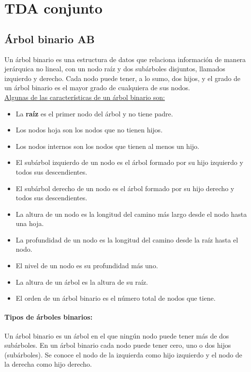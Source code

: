 \documentclass[../main.tex]{subfiles}
\begin{document}
\section{TDA conjunto} 
    \subsection{Árbol binario AB}
        Un árbol binario es una estructura de datos que relaciona información de manera jerárquica no lineal, con un nodo raíz y dos subárboles disjuntos, llamados izquierdo y derecho. Cada nodo puede tener, a lo sumo, dos hijos, y el grado de un árbol binario es el mayor grado de cualquiera de sus nodos.\\

        \underline{Algunas de las características de un árbol binario son:}
        \begin{itemize}
            \item La \textbf{raíz} es el primer nodo del árbol y no tiene padre.
            \item Los nodos hoja son los nodos que no tienen hijos.
            \item Los nodos internos son los nodos que tienen al menos un hijo.
            \item El subárbol izquierdo de un nodo es el árbol formado por su hijo izquierdo y todos sus descendientes.
            \item El subárbol derecho de un nodo es el árbol formado por su hijo derecho y todos sus descendientes.
            \item La altura de un nodo es la longitud del camino más largo desde el nodo hasta una hoja.
            \item La profundidad de un nodo es la longitud del camino desde la raíz hasta el nodo.
            \item El nivel de un nodo es su profundidad más uno.
            \item La altura de un árbol es la altura de su raíz.
            \item El orden de un árbol binario es el número total de nodos que tiene.
        \end{itemize}

        \paragraph{Tipos de árboles binarios:}
        Un árbol binario es un árbol en el que ningún nodo puede tener más de dos subárboles. En un árbol binario cada nodo puede tener cero, uno o dos hijos (subárboles). Se conoce el nodo de la izquierda como hijo izquierdo y el nodo de la derecha como hijo derecho.
\end{document}
